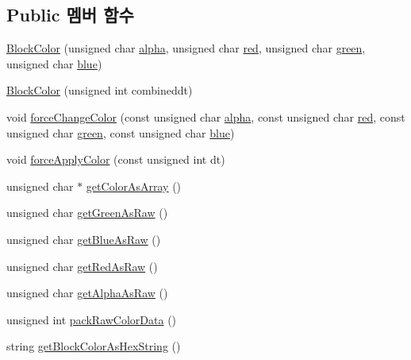 \subsection*{Public 멤버 함수}
\begin{DoxyCompactItemize}
\item 
\hyperlink{class_tetris_1_1_block_sub_modules_1_1_block_color_abb929df07c6b378e31d76b7298eb9e12}{Block\+Color} (unsigned char \hyperlink{class_tetris_1_1_block_sub_modules_1_1_block_color_af0983ea684f33617a0b482cfea1d3c2b}{alpha}, unsigned char \hyperlink{class_tetris_1_1_block_sub_modules_1_1_block_color_af8a0dc372e7dbab300290eadada8ef49}{red}, unsigned char \hyperlink{class_tetris_1_1_block_sub_modules_1_1_block_color_a4b28885bfd8bf53793c6b3daedd974eb}{green}, unsigned char \hyperlink{class_tetris_1_1_block_sub_modules_1_1_block_color_af04e78b9a1c2f7625863c289c4a741e3}{blue})
\item 
\hyperlink{class_tetris_1_1_block_sub_modules_1_1_block_color_aba62c9da4cb4b43caa871452a34790a9}{Block\+Color} (unsigned int combineddt)
\item 
void \hyperlink{class_tetris_1_1_block_sub_modules_1_1_block_color_ae6d640629b11d880ca994923657adbe1}{force\+Change\+Color} (const unsigned char \hyperlink{class_tetris_1_1_block_sub_modules_1_1_block_color_af0983ea684f33617a0b482cfea1d3c2b}{alpha}, const unsigned char \hyperlink{class_tetris_1_1_block_sub_modules_1_1_block_color_af8a0dc372e7dbab300290eadada8ef49}{red}, const unsigned char \hyperlink{class_tetris_1_1_block_sub_modules_1_1_block_color_a4b28885bfd8bf53793c6b3daedd974eb}{green}, const unsigned char \hyperlink{class_tetris_1_1_block_sub_modules_1_1_block_color_af04e78b9a1c2f7625863c289c4a741e3}{blue})
\item 
void \hyperlink{class_tetris_1_1_block_sub_modules_1_1_block_color_a260b5dd85cdf3145be7564dc2c0ee53d}{force\+Apply\+Color} (const unsigned int dt)
\item 
unsigned char $\ast$ \hyperlink{class_tetris_1_1_block_sub_modules_1_1_block_color_ac626961ee3894d89a7fc961e9f40c92f}{get\+Color\+As\+Array} ()
\item 
unsigned char \hyperlink{class_tetris_1_1_block_sub_modules_1_1_block_color_a65e9230325a2f44aa433f39c199aabcd}{get\+Green\+As\+Raw} ()
\item 
unsigned char \hyperlink{class_tetris_1_1_block_sub_modules_1_1_block_color_ac0ad44a8b001f3824447d137357f5145}{get\+Blue\+As\+Raw} ()
\item 
unsigned char \hyperlink{class_tetris_1_1_block_sub_modules_1_1_block_color_a1795cf70c847d261645a9690afff7e9c}{get\+Red\+As\+Raw} ()
\item 
unsigned char \hyperlink{class_tetris_1_1_block_sub_modules_1_1_block_color_acb1c9b34ee534857741025bd2824201a}{get\+Alpha\+As\+Raw} ()
\item 
unsigned int \hyperlink{class_tetris_1_1_block_sub_modules_1_1_block_color_a849ebbb0e900c5efdcb99784767e7a7a}{pack\+Raw\+Color\+Data} ()
\item 
string \hyperlink{class_tetris_1_1_block_sub_modules_1_1_block_color_a79cc837f207645628542876997c9e919}{get\+Block\+Color\+As\+Hex\+String} ()
\end{DoxyCompactItemize}
